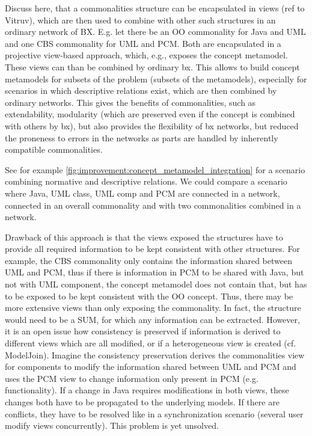 Discuss here, that a commonalities structure can be encapsulated in views (ref to Vitruv), which are then used to combine with other such structures in an ordinary network of BX. E.g. let there be an OO commonality for Java and UML and one CBS commonality for UML and PCM. Both are encapsulated in a projective view-based approach, which, e.g., exposes the concept metamodel. These views can than be combined by ordinary bx. This allows to build concept metamodels for subsets of the problem (subsets of the metamodels), especially for scenarios in which descriptive relations exist, which are then combined by ordinary networks. This gives the benefits of commonalities, such as extendability, modularity (which are preserved even if the concept is combined with others by bx), but also provides the flexibility of bx networks, but reduced the proneness to errors in the networks as parts are handled by inherently compatible commonalities.

See for example \autoref{fig:improvement:concept_metamodel_integration} for a scenario combining normative and descriptive relations. We could compare a scenario where Java, UML class, UML comp and PCM are connected in a network, connected in an overall commonality and with two commonalities combined in a network.

Drawback of this approach is that the views exposed the structures have to provide all required information to be kept consistent with other structures. For example, the CBS commonality only contains the information shared between UML and PCM, thus if there is information in PCM to be shared with Java, but not with UML component, the concept metamodel does not contain that, but has to be exposed to be kept consistent with the OO concept. Thus, there may be more extensive views than only exposing the commonality. In fact, the structure would need to be a SUM, for which any information can be extracted. However, it is an open issue how consistency is preserved if information is derived to different views which are all modified, or if a heterogeneous view is created (cf. ModelJoin). Imagine the consistency preservation derives the commonalities view for components to modify the information shared between UML and PCM and uses the PCM view to change information only present in PCM (e.g. functionality). If a change in Java requires modifications in both views, these changes both have to be propagated to the underlying models. If there are conflicts, they have to be resolved like in a synchronization scenario (several user modify views concurrently). This problem is yet unsolved.


